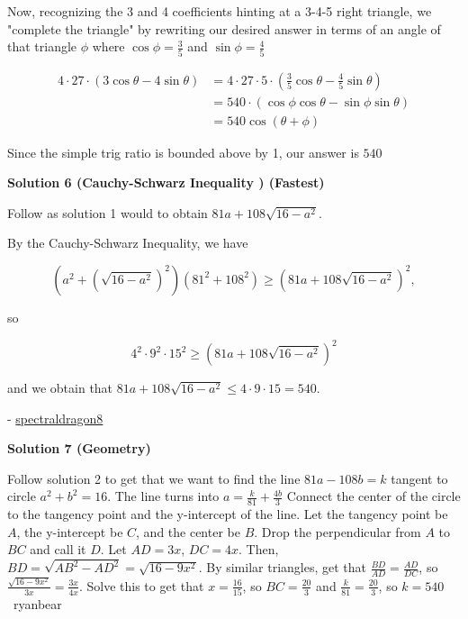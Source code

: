\begin{enumerate}
 Now, recognizing the 3 and 4 coefficients hinting at a 3-4-5 right triangle, we "complete the triangle" by rewriting our desired answer in terms of an angle of that triangle $\phi$ where $\cos\phi = \frac{3}{5}$ and $\sin\phi = \frac{4}{5}$

 \begin{align*} 4\cdot 27 \cdot(3\cos\theta - 4\sin\theta) &= 4\cdot 27 \cdot 5 \cdot (\frac{3}{5}\cos\theta - \frac{4}{5}\sin\theta) \\                                                &= 540 \cdot (\cos\phi\cos\theta - \sin\phi\sin\theta) \\                                                &= 540 \cos(\theta + \phi) \end{align*}


 Since the simple trig ratio is bounded above by 1, our answer is $\boxed{540}$




\textbf{Solution 6 (Cauchy-Schwarz Inequality ) (Fastest)}

Follow as solution 1 would to obtain $81a + 108\sqrt{16-a^2}.$

 By the Cauchy-Schwarz Inequality, we have

 
 \[(a^2 + (\sqrt{16-a^2})^2)(81^2 + 108^2) \geq (81a + 108\sqrt{16-a^2})^2,\]

 so 

 
 \[4^2 \cdot 9^2 \cdot 15^2 \geq (81a + 108\sqrt{16-a^2})^2\]

 and we obtain that $81a + 108\sqrt{16-a^2} \leq 4 \cdot 9 \cdot 15 = \boxed{540}.$

 
- \href{https://artofproblemsolving.com/wiki/index.php/User:Spectraldragon8}{spectraldragon8}

 



\textbf{Solution 7 (Geometry)}

Follow solution 2 to get that we want to find the line $81a-108b=k$ tangent to circle $a^2+b^2=16$. The line turns into $a=\frac{k}{81}+\frac{4b}{3}$	Connect the center of the circle to the tangency point and the y-intercept of the line. Let the tangency point be $A$, the y-intercept be $C$, and the center be $B$. Drop the perpendicular from $A$ to $BC$ and call it $D$. Let $AD=3x$, $DC=4x$. Then, $BD=\sqrt{AB^2-AD^2}=\sqrt{16-9x^2}$. By similar triangles, get that $\frac{BD}{AD}=\frac{AD}{DC}$, so $\frac{\sqrt{16-9x^2}}{3x}=\frac{3x}{4x}$. Solve this to get that $x=\frac{16}{15}$, so $BC=\frac{20}{3}$ and $\frac{k}{81}=\frac{20}{3}$, so $k=\boxed{540}$~ryanbear


\end{enumerate}
